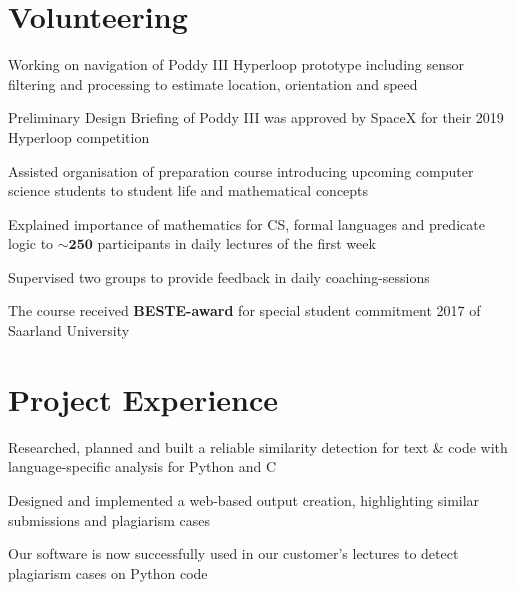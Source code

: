 \documentclass[]{deedy-resume}
\begin{document}
\begin{minipage}[t]{0.66\textwidth}

\section{Volunteering}
\begin{tightemize}
    \item Working on navigation of Poddy III Hyperloop prototype including sensor filtering and processing to estimate
    location, orientation and speed
    \item Preliminary Design Briefing of Poddy III was approved by SpaceX for their 2019 Hyperloop competition
\end{tightemize}
\sectionsep

\begin{tightemize}
    \item Assisted organisation of preparation course introducing upcoming computer science students to student life and mathematical concepts %
    \item Explained importance of mathematics for CS, formal languages and predicate logic to $\mathbf{\sim 250}$ participants in daily lectures of the first week
    \item Supervised two groups to provide feedback in daily coaching-sessions
    \item The course received \textbf{BESTE-award} for special student commitment 2017 of Saarland University
\end{tightemize}
\sectionsep



\section{Project Experience}
\begin{tightemize}
    \item Researched, planned and built a reliable similarity detection for text \& code with language-specific analysis for
    Python and C
    \item Designed and implemented a web-based output creation, highlighting similar submissions and plagiarism cases
    \item Our software is now successfully used in our customer's lectures to detect plagiarism cases on Python code
\end{tightemize}



\end{minipage}
\end{document}
